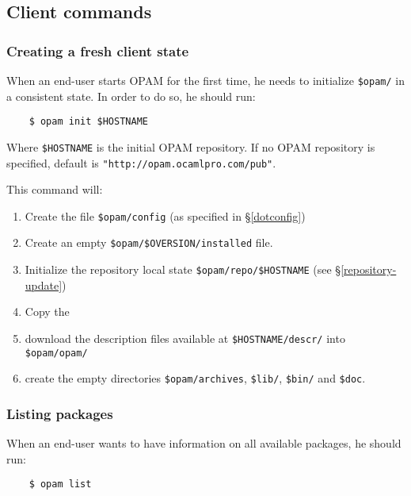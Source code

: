 \documentclass[a4paper,11pt]{article}
\begin{document}
\subsection{Client commands}

\subsubsection{Creating a fresh client state}

When an end-user starts OPAM for the first time, he needs to
initialize \verb+$opam/+ in a consistent state. In order to do so, he
should run:

\begin{verbatim}
    $ opam init $HOSTNAME
\end{verbatim}

Where \verb+$HOSTNAME+ is the initial OPAM repository.  If no OPAM
repository is specified, default is
\verb+"http://opam.ocamlpro.com/pub"+.

This command will:

\begin{enumerate}

\item Create the file \verb+$opam/config+ (as specified in
  \S\ref{dotconfig})

\item Create an empty \verb+$opam/$OVERSION/installed+ file.

\item Initialize the repository local state \verb+$opam/repo/$HOSTNAME+ (see
  \S\ref{repository-update})

\item Copy the \item download the description files available at
  \verb+$HOSTNAME/descr/+ into \verb+$opam/opam/+

\item create the empty directories \verb+$opam/archives+,
  \verb+$lib/+, \verb+$bin/+ and \verb+$doc+.

\end{enumerate}

\subsubsection{Listing packages}

When an end-user wants to have information on all available packages,
he should run:

\begin{verbatim}
    $ opam list
\end{verbatim}
\end{document}
